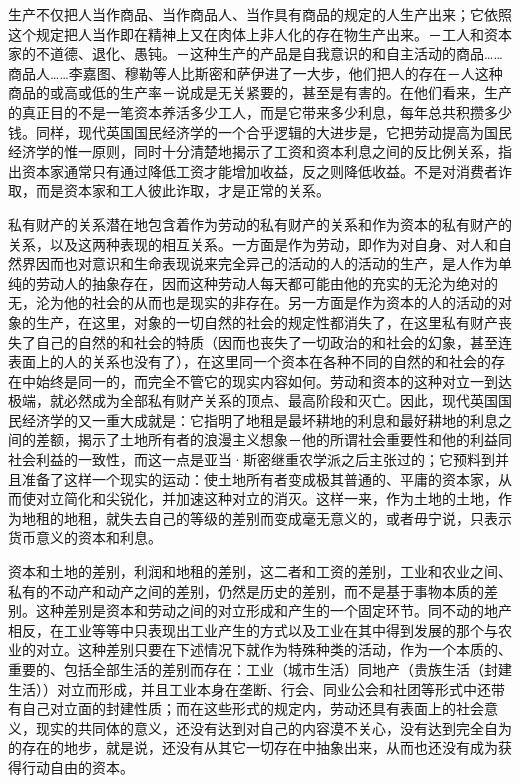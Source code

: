 \documentclass[a4paper,twoside,12pt]{ctexart}
\begin{document}
生产不仅把人当作商品、当作商品人、当作具有商品的规定的人生产出来；它依照这个规定把人当作即在精神上又在肉体上非人化的存在物生产出来。－工人和资本家的不道德、退化、愚钝。－这种生产的产品是自我意识的和自主活动的商品……商品人……李嘉图、穆勒等人比斯密和萨伊进了一大步，他们把人的存在－人这种商品的或高或低的生产率－说成是无关紧要的，甚至是有害的。在他们看来，生产的真正目的不是一笔资本养活多少工人，而是它带来多少利息，每年总共积攒多少钱。同样，现代英国国民经济学的一个合乎逻辑的大进步是，它把劳动提高为国民经济学的惟一原则，同时十分清楚地揭示了工资和资本利息之间的反比例关系，指出资本家通常只有通过降低工资才能增加收益，反之则降低收益。不是对消费者诈取，而是资本家和工人彼此诈取，才是正常的关系。

私有财产的关系潜在地包含着作为劳动的私有财产的关系和作为资本的私有财产的关系，以及这两种表现的相互关系。一方面是作为劳动，即作为对自身、对人和自然界因而也对意识和生命表现说来完全异己的活动的人的活动的生产，是人作为单纯的劳动人的抽象存在，因而这种劳动人每天都可能由他的充实的无沦为绝对的无，沦为他的社会的从而也是现实的非存在。另一方面是作为资本的人的活动的对象的生产，在这里，对象的一切自然的社会的规定性都消失了，在这里私有财产丧失了自己的自然的和社会的特质（因而也丧失了一切政治的和社会的幻象，甚至连表面上的人的关系也没有了），在这里同一个资本在各种不同的自然的和社会的存在中始终是同一的，而完全不管它的现实内容如何。劳动和资本的这种对立一到达极端，就必然成为全部私有财产关系的顶点、最高阶段和灭亡。因此，现代英国国民经济学的又一重大成就是：它指明了地租是最坏耕地的利息和最好耕地的利息之间的差额，揭示了土地所有者的浪漫主义想象－他的所谓社会重要性和他的利益同社会利益的一致性，而这一点是亚当·斯密继重农学派之后主张过的；它预料到并且准备了这样一个现实的运动：使土地所有者变成极其普通的、平庸的资本家，从而使对立简化和尖锐化，并加速这种对立的消灭。这样一来，作为土地的土地，作为地租的地租，就失去自己的等级的差别而变成毫无意义的，或者毋宁说，只表示货币意义的资本和利息。

资本和土地的差别，利润和地租的差别，这二者和工资的差别，工业和农业之间、私有的不动产和动产之间的差别，仍然是历史的差别，而不是基于事物本质的差别。这种差别是资本和劳动之间的对立形成和产生的一个固定环节。同不动的地产相反，在工业等等中只表现出工业产生的方式以及工业在其中得到发展的那个与农业的对立。这种差别只要在下述情况下就作为特殊种类的活动，作为一个本质的、重要的、包括全部生活的差别而存在：工业（城市生活）同地产（贵族生活（封建生活））对立而形成，并且工业本身在垄断、行会、同业公会和社团等形式中还带有自己对立面的封建性质；而在这些形式的规定内，劳动还具有表面上的社会意义，现实的共同体的意义，还没有达到对自己的内容漠不关心，没有达到完全自为的存在的地步，就是说，还没有从其它一切存在中抽象出来，从而也还没有成为获得行动自由的资本。
\end{document}
